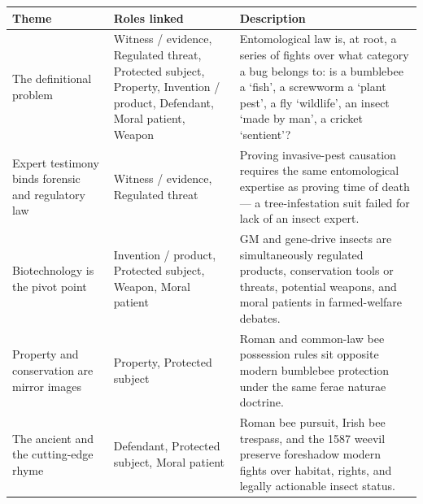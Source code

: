 \documentclass[
  english,
]{article}
\newcounter{none} %
\begin{document}
{\def\LTcaptype{none} %
\begin{longtable}[]{@{}
  >{\raggedright\arraybackslash}p{}
  >{\raggedright\arraybackslash}p{}
  >{\raggedright\arraybackslash}p{}@{}}
\toprule\noalign{}
\begin{minipage}[b]{\linewidth}\raggedright
Theme
\end{minipage} & \begin{minipage}[b]{\linewidth}\raggedright
Roles linked
\end{minipage} & \begin{minipage}[b]{\linewidth}\raggedright
Description
\end{minipage} \\
\midrule\noalign{}
\endhead
\bottomrule\noalign{}
\endlastfoot
The definitional problem & Witness / evidence, Regulated threat,
Protected subject, Property, Invention / product, Defendant, Moral
patient, Weapon & Entomological law is, at root, a series of fights over
what category a bug belongs to: is a bumblebee a `fish', a screwworm a
`plant pest', a fly `wildlife', an insect `made by man', a cricket
`sentient'? \\
Expert testimony binds forensic and regulatory law & Witness / evidence,
Regulated threat & Proving invasive-pest causation requires the same
entomological expertise as proving time of death --- a tree-infestation
suit failed for lack of an insect expert. \\
Biotechnology is the pivot point & Invention / product, Protected
subject, Weapon, Moral patient & GM and gene-drive insects are
simultaneously regulated products, conservation tools or threats,
potential weapons, and moral patients in farmed-welfare debates. \\
Property and conservation are mirror images & Property, Protected
subject & Roman and common-law bee possession rules sit opposite modern
bumblebee protection under the same ferae naturae doctrine. \\
The ancient and the cutting-edge rhyme & Defendant, Protected subject,
Moral patient & Roman bee pursuit, Irish bee trespass, and the 1587
weevil preserve foreshadow modern fights over habitat, rights, and
legally actionable insect status. \\
\end{longtable}
}
\end{document}
